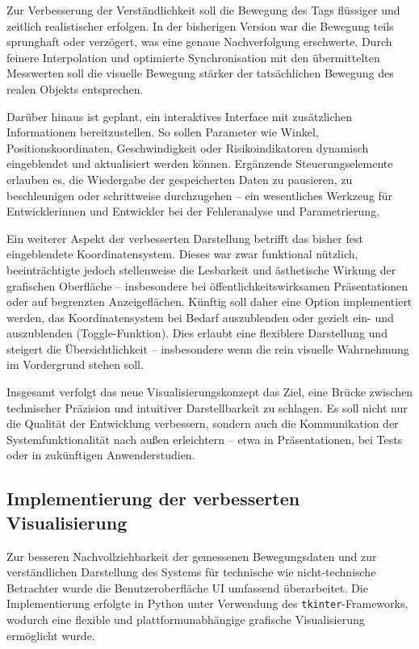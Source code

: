 \documentclass[a4paper, 12pt]{article} %
\begin{document}
Zur Verbesserung der Verständlichkeit soll die Bewegung des Tags flüssiger und zeitlich realistischer erfolgen. In der bisherigen Version war die 
Bewegung teils sprunghaft oder verzögert, was eine genaue Nachverfolgung erschwerte. Durch feinere Interpolation und optimierte Synchronisation mit 
den übermittelten Messwerten soll die visuelle Bewegung stärker der tatsächlichen Bewegung des realen Objekts entsprechen.

Darüber hinaus ist geplant, ein interaktives Interface mit zusätzlichen Informationen bereitzustellen. So sollen Parameter wie Winkel, 
Positionskoordinaten, Geschwindigkeit oder Risikoindikatoren dynamisch eingeblendet und aktualisiert werden können. Ergänzende Steuerungselemente erlauben
 es, die Wiedergabe der gespeicherten Daten zu pausieren, zu beschleunigen oder schrittweise durchzugehen – ein wesentliches Werkzeug für Entwicklerinnen 
 und Entwickler bei der Fehleranalyse und Parametrierung.

Ein weiterer Aspekt der verbesserten Darstellung betrifft das bisher fest eingeblendete Koordinatensystem. Dieses war zwar funktional nützlich,
 beeinträchtigte jedoch stellenweise die Lesbarkeit und ästhetische Wirkung der grafischen Oberfläche – insbesondere bei öffentlichkeitswirksamen 
 Präsentationen oder auf begrenzten Anzeigeflächen. Künftig soll daher eine Option implementiert werden, das Koordinatensystem bei Bedarf auszublenden 
 oder gezielt ein- und auszublenden (Toggle-Funktion). Dies erlaubt eine flexiblere Darstellung und steigert die Übersichtlichkeit – insbesondere wenn 
 die rein visuelle Wahrnehmung im Vordergrund stehen soll.

Insgesamt verfolgt das neue Visualisierungskonzept das Ziel, eine Brücke zwischen technischer Präzision und intuitiver Darstellbarkeit zu schlagen. 
Es soll nicht nur die Qualität der Entwicklung verbessern, sondern auch die Kommunikation der Systemfunktionalität nach außen erleichtern – etwa in 
Präsentationen, bei Tests oder in zukünftigen Anwenderstudien.

\subsection{Implementierung der verbesserten Visualisierung}
Zur besseren Nachvollziehbarkeit der gemessenen Bewegungsdaten und zur verständlichen Darstellung des Systems für technische wie nicht-technische 
Betrachter wurde die Benutzeroberfläche \ac{UI} umfassend überarbeitet. Die Implementierung erfolgte in Python unter Verwendung des 
\texttt{tkinter}-Frameworks, wodurch eine flexible und plattformunabhängige grafische Visualisierung ermöglicht wurde.
\end{document}
